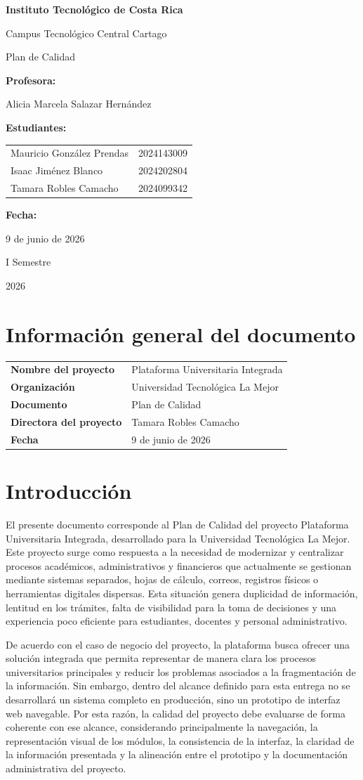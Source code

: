 \documentclass[11pt,spanish]{article}
\title{\DocumentoTitulo}
\author{\AutoresPortada}
\date{\FechaDocumento}
\makeatletter
\newcommand{\Institucion}{Instituto Tecnológico de Costa Rica}
\newcommand{\Campus}{Campus Tecnológico Central Cartago}
\newcommand{\DocumentoTitulo}{Plan de Calidad}
\newcommand{\Profesor}{Alicia Marcela Salazar Hernández}
\newcommand{\FechaDocumento}{9 de junio de 2026}
\newcommand{\PeriodoAcademico}{I Semestre}
\newcommand{\AnioDocumento}{2026}
\newcommand{\AutoresPortada}{%
    \begin{tabular}{l@{\hspace{1.5cm}}r}
        Mauricio González Prendas & 2024143009\\
        Isaac Jiménez Blanco & 2024202804\\
        Tamara Robles Camacho & 2024099342
    \end{tabular}%
}
\newcommand{\MakeCover}{%
\begin{titlepage}
\thispagestyle{empty}
\centering

{\bfseries \huge \Institucion \par}
\vspace{0.25cm}
{\LARGE \Campus \par}

\vfill

{\huge \DocumentoTitulo \par}


\vfill

{\bfseries \LARGE Profesora: \par}
{\Large \Profesor \par}

\vfill

{\bfseries \LARGE Estudiantes: \par}
{\Large \AutoresPortada \par}

\vfill

{\bfseries\LARGE Fecha: \par}
{\Large \FechaDocumento \par}

\vfill

{\LARGE \PeriodoAcademico \par}
{\LARGE \AnioDocumento \par}

\end{titlepage}%
}
\makeatother
\begin{document}
\hypersetup{pageanchor=false}

\MakeCover

\pagestyle{empty}
\tableofcontents
\clearpage
{}
\hypersetup{pageanchor=true}
\pagestyle{fancy}

\section{Información general del documento}

\begin{table}[H]
\centering
\begin{tabularx}{\textwidth}{p{5cm} Y}
\toprule
\textbf{Nombre del proyecto} & Plataforma Universitaria Integrada \\
\textbf{Organización} & Universidad Tecnológica La Mejor \\
\textbf{Documento} & \DocumentoTitulo \\
\textbf{Directora del proyecto} & Tamara Robles Camacho \\
\textbf{Fecha} & \FechaDocumento \\
\bottomrule
\end{tabularx}
\end{table}

\section{Introducción}

El presente documento corresponde al Plan de Calidad del proyecto Plataforma Universitaria Integrada, desarrollado para la Universidad Tecnológica La Mejor. Este proyecto surge como respuesta a la necesidad de modernizar y centralizar procesos académicos, administrativos y financieros que actualmente se gestionan mediante sistemas separados, hojas de cálculo, correos, registros físicos o herramientas digitales dispersas. Esta situación genera duplicidad de información, lentitud en los trámites, falta de visibilidad para la toma de decisiones y una experiencia poco eficiente para estudiantes, docentes y personal administrativo.

De acuerdo con el caso de negocio del proyecto, la plataforma busca ofrecer una solución integrada que permita representar de manera clara los procesos universitarios principales y reducir los problemas asociados a la fragmentación de la información. Sin embargo, dentro del alcance definido para esta entrega no se desarrollará un sistema completo en producción, sino un prototipo de interfaz web navegable. Por esta razón, la calidad del proyecto debe evaluarse de forma coherente con ese alcance, considerando principalmente la navegación, la representación visual de los módulos, la consistencia de la interfaz, la claridad de la información presentada y la alineación entre el prototipo y la documentación administrativa del proyecto.
\end{document}
